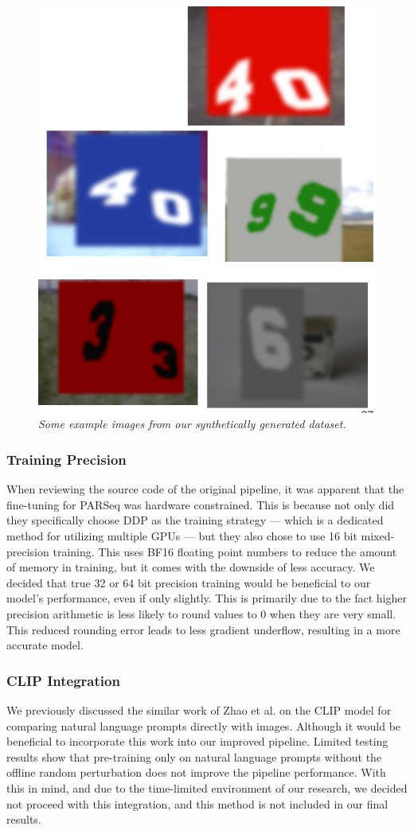 \documentclass[11pt, letterpaper]{article}
\begin{document}
\begin{figure}
  \centering
  \includegraphics[width=0.5\linewidth]{img/synthetic_example.png}
  \caption{\label{fig:synthetic_example}\textit{Some example images from our synthetically generated dataset.}}
\end{figure}

\subsubsection{Training Precision}

When reviewing the source code of the original pipeline, it was apparent that the fine-tuning for PARSeq was hardware constrained. This is because not only did they specifically choose DDP as the training strategy — which is a dedicated method for utilizing multiple GPUs — but they also chose to use 16 bit mixed-precision training. This uses BF16 floating point numbers to reduce the amount of memory in training, but it comes with the downside of less accuracy. We decided that true 32 or 64 bit precision training would be beneficial to our model's performance, even if only slightly. This is primarily due to the fact higher precision arithmetic is less likely to round values to 0 when they are very small. This reduced rounding error leads to less gradient underflow, resulting in a more accurate model.

\subsubsection{CLIP Integration}

We previously discussed the similar work of Zhao et al. on the CLIP model for comparing natural language prompts directly with images. Although it would be beneficial to incorporate this work into our improved pipeline. Limited testing results show that pre-training only on natural language prompts without the offline random perturbation does not improve the pipeline performance. With this in mind, and due to the time-limited environment of our research, we decided not proceed with this integration, and this method is not included in our final results.
\end{document}
